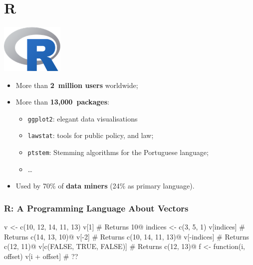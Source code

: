 \documentclass{beamer}
\newcommand\emphb{\textbf}
\begin{document}
\section{R}

\begin{frame}
    \begin{center}
        \includegraphics[width=3cm]{images/Rlogo.png}
    \end{center}

    \vfill

    \begin{itemize}
        \item More than \emphb{2~million users} worldwide;
        \item More than \emphb{13,000~packages}:
            \begin{itemize}
                \item \texttt{ggplot2}: elegant data visualisations
                \item \texttt{lawstat}: tools for public policy, and law;
                \item \texttt{ptstem}: Stemming algorithms for the Portuguese language;
                \item …
            \end{itemize}
        \item Used by 70\% of \emphb{data miners} (24\% as primary language).
    \end{itemize}
\end{frame}

\begin{frame}[fragile]
    \frametitle{R: A Programming Language About Vectors}

\begin{Rcode}
v <- c(10, 12, 14, 11, 13)
v[1]                         # Returns 10@\pause@
indices <- c(3, 5, 1)
v[indices]                   # Returns c(14, 13, 10)@\pause@
v[-2]                        # Returns c(10, 14, 11, 13)@\pause@
v[-indices]                  # Returns c(12, 11)@\pause@
v[c(FALSE, TRUE, FALSE)]     # Returns c(12, 13)@\pause@
f <- function(i, offset)
       v[i + offset]         # ??
\end{Rcode}

\end{frame}
\end{document}
